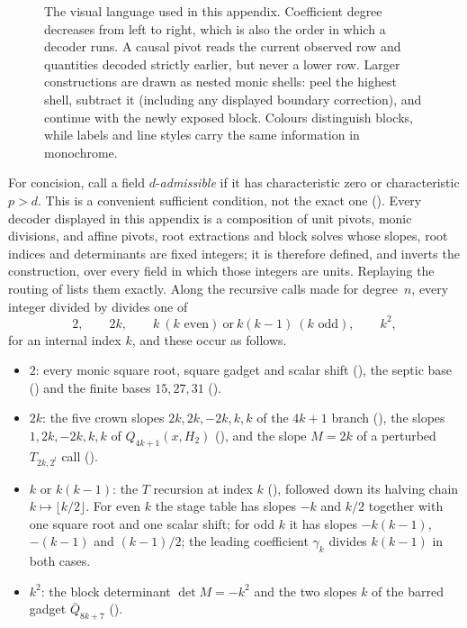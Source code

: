 \begin{figure}[H]
  \centering
  \resizebox{\textwidth}{!}{}
  \caption{The visual language used in this appendix.  Coefficient degree
  decreases from left to right, which is also the order in which a decoder
  runs.  A causal pivot reads the current observed row and quantities decoded
  strictly earlier, but never a lower row.  Larger constructions are drawn as
  nested monic shells: peel the highest shell, subtract it (including any
  displayed boundary correction), and continue with the newly exposed
  block.  Colours distinguish blocks, while labels and line styles carry the
  same information in monochrome.}
  \label{fig:decoder-language}
\end{figure}

For concision, call a field $d$-\emph{admissible} if it has characteristic
zero or characteristic $p>d$.  This is a convenient sufficient condition,
not the exact one ().  Every decoder displayed in this
appendix is a composition of unit pivots, monic divisions, and affine
pivots, root extractions and block solves whose slopes, root indices and
determinants are fixed integers; it is therefore defined, and inverts the
construction, over every field in which those integers are units.
Replaying the routing of  lists them exactly.
Along the recursive calls made for degree~$n$, every integer divided by
divides one of
\begin{equation}
\label{eq:bad-primes}
  2,\qquad 2k,\qquad k\ (k\text{ even})\ \text{or}\ k(k-1)\ (k\text{ odd}),
  \qquad k^2,
\end{equation}
for an internal index $k$, and these occur as follows.
\begin{itemize}
  \item $2$: every monic square root, square gadget and scalar shift
    (),
    the septic base () and the finite bases $15,27,31$
    ().
  \item $2k$: the five crown slopes $2k,2k,-2k,k,k$ of the $4k+1$ branch
    (), the slopes $1,2k,-2k,k,k$ of
    $Q_{4k+1}(x,H_2)$ (), and the slope $M=2k$ of a perturbed
    $T_{2k,2^l}$ call ().
  \item $k$ or $k(k-1)$: the $T$ recursion at index $k$
    (), followed down its halving
    chain $k\mapsto\lfloor k/2\rfloor$.  For even $k$ the stage table has
    slopes $-k$ and $k/2$ together with one square root and one scalar
    shift; for odd $k$ it has slopes $-k(k-1)$, $-(k-1)$ and $(k-1)/2$; the
    leading coefficient $\gamma_k$ divides $k(k-1)$ in both cases.
  \item $k^2$: the block determinant $\det M=-k^2$ and the two slopes $k$
    of the barred gadget $\bar Q_{8k+7}$ ().
\end{itemize}
